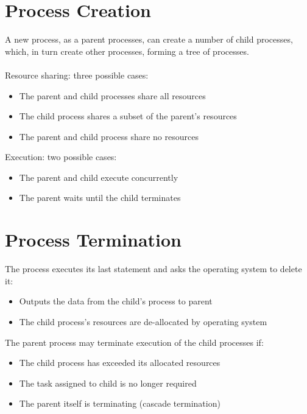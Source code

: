 \documentclass{article}[18pt]
\begin{document}
\section{Process Creation}
A new process, as a parent processes, can create a number of child processes, which, in turn create other processes, forming a tree of processes.\\
\\
Resource sharing: three possible cases:
\begin{itemize}
	\item The parent and child processes share all resources
	\item The child process shares a subset of the parent's resources
	\item The parent and child process share no resources
\end{itemize}
Execution: two possible cases:
\begin{itemize}
	\item The parent and child execute concurrently
	\item The parent waits until the child terminates
\end{itemize}
\section{Process Termination}
The process executes its last statement and asks the operating system to delete it:
\begin{itemize}
	\item Outputs the data from the child's process to parent
	\item The child process's resources are de-allocated by operating system
\end{itemize}
The parent process may terminate execution of the child processes if:
\begin{itemize}
	\item The child process has exceeded its allocated resources
	\item The task assigned to child is no longer required
	\item The parent itself is terminating (cascade termination)
\end{itemize}
\end{document}
